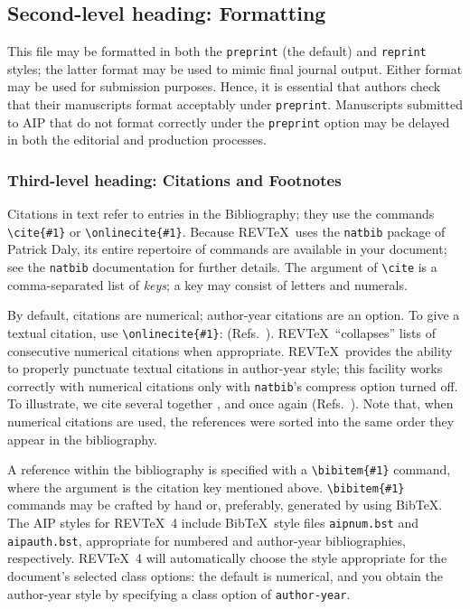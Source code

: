 \documentclass[aip,cp,amsmath,amssymb,reprint]{revtex4-2}
\begin{document}
\subsection{\label{sec:level2}Second-level heading: Formatting}

This file may be formatted in both the \texttt{preprint} (the default) and
\texttt{reprint} styles; the latter format may be used to
mimic final journal output. Either format may be used for submission
purposes. Hence, it is essential that authors check that their manuscripts format acceptably
under \texttt{preprint}. Manuscripts submitted to AIP that do not
format correctly under the \texttt{preprint} option may be delayed in
both the editorial and production processes.

\subsubsection{\label{sec:level3}Third-level heading: Citations and Footnotes}

Citations in text refer to entries in the Bibliography;
they use the commands \verb+\cite{#1}+ or \verb+\onlinecite{#1}+.
Because REV\TeX\ uses the \verb+natbib+ package of Patrick Daly,
its entire repertoire of commands are available in your document;
see the \verb+natbib+ documentation for further details.
The argument of \verb+\cite+ is a comma-separated list of \emph{keys};
a key may consist of letters and numerals.

By default, citations are numerical; \cite{feyn54} author-year citations are an option.
To give a textual citation, use \verb+\onlinecite{#1}+: (Refs.~).
REV\TeX\ ``collapses'' lists of consecutive numerical citations when appropriate.
REV\TeX\ provides the ability to properly punctuate textual citations in author-year style;
this facility works correctly with numerical citations only with \texttt{natbib}'s compress option turned off.
To illustrate, we cite several together \cite{feyn54,witten2001,epr,Berman1983},
and once again (Refs.~).
Note that, when numerical citations are used, the references were sorted into the same order they appear in the bibliography.

A reference within the bibliography is specified with a \verb+\bibitem{#1}+ command,
where the argument is the citation key mentioned above.
\verb+\bibitem{#1}+ commands may be crafted by hand or, preferably,
generated by using Bib\TeX.
The AIP styles for REV\TeX~4 include Bib\TeX\ style files
\verb+aipnum.bst+ and \verb+aipauth.bst+, appropriate for
numbered and author-year bibliographies,
respectively.
REV\TeX~4 will automatically choose the style appropriate for
the document's selected class options: the default is numerical, and
you obtain the author-year style by specifying a class option of \verb+author-year+.
\end{document}
